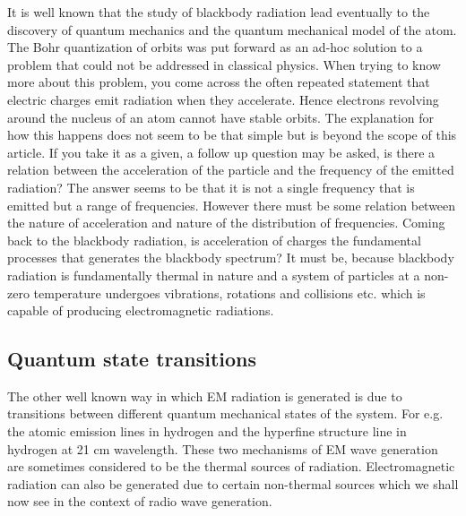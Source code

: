 \documentclass{../template/texnote}
\begin{document}
It is well known that the study of blackbody radiation lead eventually to the discovery of quantum mechanics and the quantum mechanical model of the atom. The Bohr quantization of orbits was put forward as an ad-hoc solution to a problem that could not be addressed in classical physics.
When trying to  know more about this problem, you come across the often repeated statement that electric charges emit radiation when they accelerate. Hence  electrons revolving around the nucleus of an atom cannot have stable orbits. The explanation for how this happens does not seem to be that simple but is beyond the scope of this article. If you take it as a given, a follow up question may be asked, is there a relation between the acceleration of the particle and the frequency of the emitted radiation? The answer seems to be that it is not a single frequency that is emitted but a range of frequencies. However there must be some relation between the nature of acceleration and nature of the distribution of frequencies. 
Coming back to the blackbody radiation, is acceleration of charges the fundamental processes that generates the blackbody spectrum? It must be, because blackbody radiation is fundamentally thermal in nature and a system of particles at a non-zero temperature undergoes vibrations, rotations and collisions etc. which is capable of producing electromagnetic radiations. %

\subsection{Quantum state transitions}
The other well known way in which EM radiation is generated is due to transitions between different quantum mechanical states of the system. For e.g. the atomic emission lines in hydrogen and the hyperfine structure line in hydrogen at 21 cm wavelength.
These two mechanisms of EM wave generation are sometimes considered to be the thermal sources of radiation. Electromagnetic radiation can also be generated due to certain non-thermal sources which we shall now see in the context of radio wave generation. 
\end{document}

